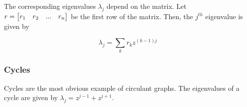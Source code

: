 The corresponding eigenvalues $\lambda_j$ depend on the matrix. Let
$r = \begin{bmatrix}r_1 & r_2 & ... & r_n \end{bmatrix}$ be the first row of the matrix. Then, the
$j^{th}$ eigenvalue is given by

\[\lambda_j = \sum_{k}r_kz^{(k-1)j} \]


\subsubsection*{Cycles}

Cycles are the most obvious example of circulant graphs. The eigenvalues of a
cycle are given by $\lambda_j = z^{j-1} + z^{j+1}$.


